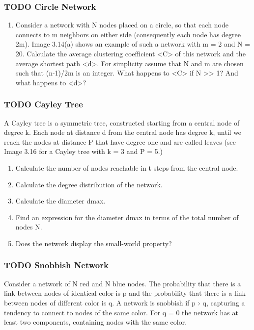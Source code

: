 \documentclass[11pt]{article}
\begin{document}
\subsubsection{{\bfseries\sffamily TODO} Circle Network}
\label{sec:org42cdd8a}
\begin{enumerate}
\item Consider a network with N nodes placed on a circle, so that each node connects to m neighbors on either side (consequently each node has degree 2m). Image 3.14(a) shows an example of such a network with m = 2 and N = 20. Calculate the average clustering coefficient <C> of this network and the average shortest path <d>. For simplicity assume that N and m are chosen such that (n-1)/2m is an integer. What happens to <C> if N >> 1? And what happens to <d>?
\end{enumerate}

\subsubsection{{\bfseries\sffamily TODO} Cayley Tree}
\label{sec:orgd49115f}
A Cayley tree is a symmetric tree, constructed starting from a central node of degree k. Each node at distance d from the central node has degree k, until we reach the nodes at distance P that have degree one and are called leaves (see Image 3.16 for a Cayley tree with k = 3 and P = 5.)

\begin{enumerate}
\item Calculate the number of nodes reachable in t steps from the central node.
\item Calculate the degree distribution of the network.
\item Calculate the diameter dmax.
\item Find an expression for the diameter dmax in terms of the total number of nodes N.
\item Does the network display the small-world property?
\end{enumerate}

\subsubsection{{\bfseries\sffamily TODO} Snobbish Network}
\label{sec:org7e7464c}
Consider a network of N red and N blue nodes. The probability that there is a link between nodes of identical color is p and the probability that there is a link between nodes of different color is q. A network is snobbish if p › q, capturing a tendency to connect to nodes of the same color. For q = 0 the network has at least two components, containing nodes with the same color.
\end{document}
